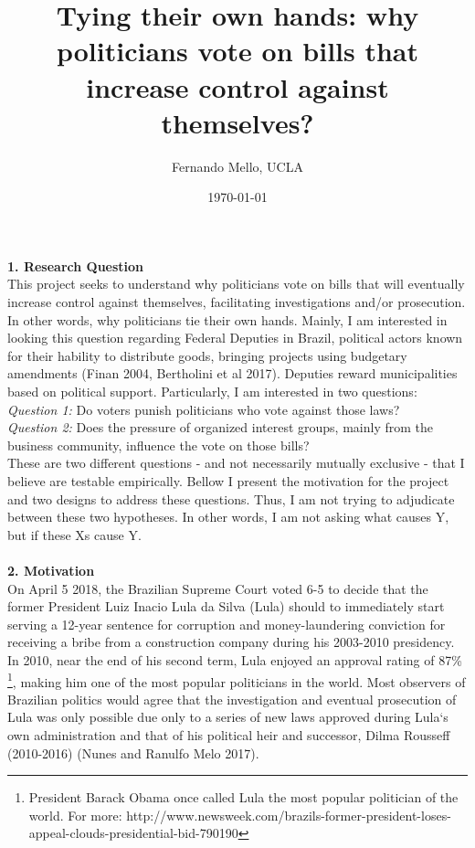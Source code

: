 \documentclass[12pt,a4paper]{article}
\begin{document}
\title{Tying their own hands: why politicians vote on bills that increase control against themselves?}
\author{Fernando Mello, UCLA}
\date{\today}


\maketitle
\textbf{1. Research Question}\\

This project seeks to understand why politicians vote on bills that will eventually increase control against themselves, facilitating investigations and/or prosecution. In other words, why politicians tie their own hands. Mainly, I am interested in looking this question regarding Federal Deputies in Brazil, political actors known for their hability to distribute goods, bringing projects using budgetary amendments (Finan 2004, Bertholini et al 2017). Deputies reward municipalities based on political support. Particularly, I am interested in two questions:\\

\emph{Question 1:} Do voters punish politicians who vote against those laws?\\


\emph{Question 2:} Does the pressure of organized interest groups, mainly from the business community, influence the vote on those bills?\\


These are two different questions - and not necessarily mutually exclusive - that I believe are testable empirically. Bellow I present the motivation for the project and two designs to address these questions. Thus, I am not trying to adjudicate between these two hypotheses. In other words, I am not asking what causes Y, but if these Xs cause Y. \\
\\


\textbf{2. Motivation}\\


On April 5 2018, the Brazilian Supreme Court voted 6-5 to decide that the former President Luiz Inacio Lula da Silva (Lula) should to immediately start serving a 12-year sentence for corruption and money-laundering conviction for receiving a bribe from a construction company during his 2003-2010 presidency. In 2010, near the end of his second term, Lula enjoyed an approval rating of 87\% \footnote{President Barack Obama once called Lula the most popular politician of the world. For more: http://www.newsweek.com/brazils-former-president-loses-appeal-clouds-presidential-bid-790190}, making him one of the most popular politicians in the world. Most observers of Brazilian politics would agree that the investigation and eventual prosecution of Lula was only possible due only to a series of new laws approved during Lula`s own administration and that of his political heir and successor, Dilma Rousseff (2010-2016) (Nunes and Ranulfo Melo 2017).  
\end{document}
